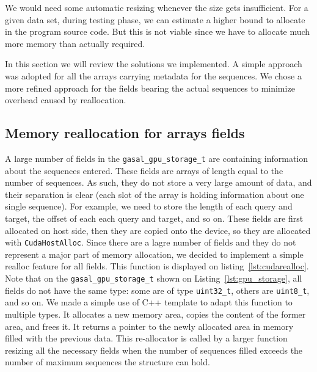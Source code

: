 We would need some automatic resizing whenever the size gets insufficient.
For a given data set, during testing phase, we can estimate a higher bound to allocate in the program source code. But this is not viable since we have to allocate much more memory than actually required.

In this section we will review the solutions we implemented. A simple approach was adopted for all the arrays carrying metadata for the sequences. We chose a more refined approach for the fields bearing the actual sequences to minimize overhead caused by reallocation.

\subsection{Memory reallocation for arrays fields}

A large number of fields in the \verb|gasal_gpu_storage_t| are containing information about the sequences entered. These fields are arrays of length equal to the number of sequences. As such, they do not store a very large amount of data, and their separation is clear (each slot of the array is holding information about one single sequence). For example, we need to store the length of each query and target, the offset of each each query and target, and so on. These fields are first allocated on host side, then they are copied onto the device, so they are allocated with \verb|CudaHostAlloc|. Since there are a lagre number of fields and they do not represent a major part of memory allocation, we decided to implement a simple realloc feature for all fields. This function is displayed on listing~\ref{lst:cudarealloc}. Note that on the \verb|gasal_gpu_storage_t| shown on Listing~\ref{lst:gpu_storage}, all fields do not have the same type: some are of type \verb|uint32_t|, others are \verb|uint8_t|, and so on. We made a simple use of C++ template to adapt this function to multiple types. It allocates a new memory area, copies the content of the former area, and frees it. It returns a pointer to the newly allocated area in memory filled with the previous data. This re-allocator is called by a larger function resizing all the necessary fields when the number of sequences filled exceeds the number of maximum sequences the structure can hold.

